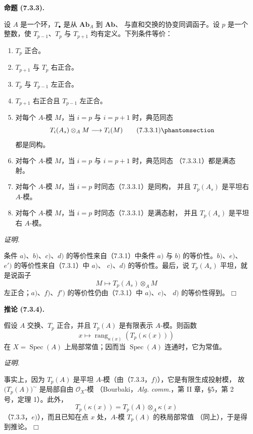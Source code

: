 \documentclass[UTF8,fontset=none,11pt,oneside,openany]{ctexbook}
\providecommand{\square}{\mdlgwhtsquare}
\newenvironment{proposition}[1][]{%
  \par\medskip\noindent\textbf{命题 (#1).}\ %
}{\par}
\newenvironment{corollary}[1][]{%
  \par\medskip\noindent\textbf{推论 (#1).}\ %
}{\par}
\newenvironment{proof}{%
  \par\smallskip\noindent\textit{证明.}\ %
}{\hfill$\square$\par}
\newcommand{\oldpage}[2][]{%
  \hypertarget{ega-source-page-#1-#2}{}%
  \marginnote{\scriptsize\textbf{#1}~|~#2}\ignorespaces}
\let\EGAOriginalLabel\label
\renewcommand{\label}[1]{\phantomsection\EGAOriginalLabel{#1}}
\begin{document}
\begin{proposition}[7.3.3]
设 $A$ 是一个环，$T_\bullet$ 是从 $\mathbf{Ab}_A$ 到 $\mathbf{Ab}$、
与直和交换的协变同调函子。设 $p$ 是一个整数，使 $T_{p-1}$、$T_p$
与 $T_{p+1}$ 均有定义。下列条件等价：
\begin{enumerate}
  \item[a)] $T_p$ 正合。
  \item[b)] $T_{p+1}$ 与 $T_p$ 右正合。
  \item[c)] $T_p$ 与 $T_{p-1}$ 左正合。
  \item[d)] $T_{p+1}$ 右正合且 $T_{p-1}$ 左正合。
  \item[e)] 对每个 $A$-模 $M$，当 $i=p$ 与 $i=p+1$ 时，典范同态
    \[
      T_i(A_s)\otimes_A M\longrightarrow T_i(M)
      \tag{7.3.3.1}\label{III.7.3.3.1.fr}
    \]
    都是同构。
  \item[$e'$)] 对每个 $A$-模 $M$，当 $i=p$ 与 $i=p+1$ 时，典范同态
    （7.3.3.1）都是满态射。
  \item[f)] 对每个 $A$-模 $M$，当 $i=p$ 时同态（7.3.3.1）是同构，
    并且 $T_p(A_s)$ 是平坦右 $A$-模。
  \item[$f'$)] 对每个 $A$-模 $M$，当 $i=p$ 时同态（7.3.3.1）是满态射，
    并且 $T_p(A_s)$ 是平坦右 $A$-模。
\end{enumerate}
\end{proposition}

\begin{proof}
条件 $a)$、$b)$、$c)$、$d)$ 的等价性来自（7.3.1）中条件 $a)$ 与
$b)$ 的等价性。$b)$、$e)$、$e')$ 的等价性来自（7.3.1）中 $a)$、
$c)$、$d)$ 的等价性。最后，说 $T_p(A_s)$ 平坦，就是说函子
\[
  M\mapsto T_p(A_s)\otimes_A M
\]
左正合；$a)$、$f)$、$f')$ 的等价性仍由（7.3.1）中 $a)$、$c)$、
$d)$ 的等价性得到。
\end{proof}

\oldpage[III]{182}

\begin{corollary}[7.3.4]
假设 $A$ 交换、$T_p$ 正合，并且 $T_p(A)$ 是有限表示 $A$-模。则函数
\[
  x\mapsto\operatorname{rang}_{\kappa(x)}(T_p(\kappa(x)))
\]
在 $X=\operatorname{Spec}(A)$ 上局部常值；因而当
$\operatorname{Spec}(A)$ 连通时，它为常值。
\end{corollary}

\begin{proof}
事实上，因为 $T_p(A)$ 是平坦 $A$-模（由（7.3.3，$f)$），它是有限生成投射模，
故 $\bigl(T_p(A)\bigr)^{\sim}$ 是局部自由 $\mathscr O_X$-模
（Bourbaki，\emph{Alg. comm.}，第 II 章，\S 5，第 2 号，定理 1）。此外，
\[
  T_p(\kappa(x))=T_p(A)\otimes_A\kappa(x)
\]
（7.3.3，$e)$），而且已知在点 $x$ 处，$A$-模 $T_p(A)$ 的秩局部常值
（同上），于是得到推论。
\end{proof}
\end{document}
